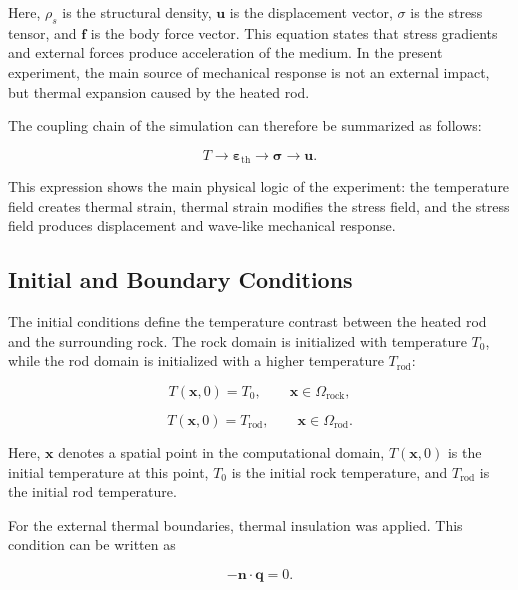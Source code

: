 Here, \(\rho_s\) is the structural density, \(\mathbf{u}\) is the displacement vector, \({\sigma}\) is the stress tensor, and \(\mathbf{f}\) is the body force vector. This equation states that stress gradients and external forces produce acceleration of the medium. In the present experiment, the main source of mechanical response is not an external impact, but thermal expansion caused by the heated rod.

The coupling chain of the simulation can therefore be summarized as follows:

\begin{equation}
T
\rightarrow
\boldsymbol{\varepsilon}_{\mathrm{th}}
\rightarrow
\boldsymbol{\sigma}
\rightarrow
\mathbf{u}.
\end{equation}

This expression shows the main physical logic of the experiment: the temperature field creates thermal strain, thermal strain modifies the stress field, and the stress field produces displacement and wave-like mechanical response.

\subsection{Initial and Boundary Conditions}

The initial conditions define the temperature contrast between the heated rod and the surrounding rock. The rock domain is initialized with temperature \(T_0\), while the rod domain is initialized with a higher temperature \(T_{\mathrm{rod}}\):

\begin{equation}
T(\mathbf{x},0) = T_0,
\qquad
\mathbf{x} \in \Omega_{\mathrm{rock}},
\end{equation}

\begin{equation}
T(\mathbf{x},0) = T_{\mathrm{rod}},
\qquad
\mathbf{x} \in \Omega_{\mathrm{rod}}.
\end{equation}

Here, \(\mathbf{x}\) denotes a spatial point in the computational domain, \(T(\mathbf{x},0)\) is the initial temperature at this point, \(T_0\) is the initial rock temperature, and \(T_{\mathrm{rod}}\) is the initial rod temperature.

For the external thermal boundaries, thermal insulation was applied. This condition can be written as

\begin{equation}
-\mathbf{n} \cdot \mathbf{q} = 0 .
\end{equation}

